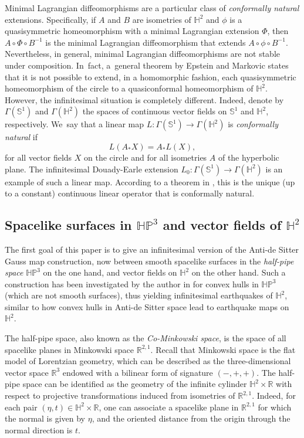 \documentclass[10pt]{amsart}
\theoremstyle{plain}
\theoremstyle{definition}
\newcommand{\HP}{\mathbb{HP}^3}
\begin{document}
Minimal Lagrangian diffeomorphisms are a particular class of \emph{conformally natural} extensions. Specifically, if \(A\) and \(B\) are isometries of \(\mathbb{H}^2\) and \(\phi\) is a quasisymmetric homeomorphism with a minimal Lagrangian extension \(\Phi\), then \(A \circ \Phi \circ B^{-1}\) is the minimal Lagrangian diffeomorphism that extends \(A \circ \phi \circ B^{-1}\). Nevertheless, in general, minimal Lagrangian diffeomorphisms are not stable under composition. In~fact, a~general theorem by Epstein and Markovic \cite{Stopdreamingthm} states that it is not possible to extend, in a homomorphic fashion, each quasisymmetric homeomorphism of the circle to a quasiconformal homeomorphism of \(\mathbb{H}^2\). However, the infinitesimal situation is completely different. Indeed, denote by $\Gamma(\mathbb{S}^1)$ and $\Gamma(\mathbb{H}^2)$ the spaces of continuous vector fields on $\mathbb{S}^1$ and $\mathbb{H}^2$, respectively. We~say that a linear map $L: \Gamma(\mathbb{S}^1) \to \Gamma(\mathbb{H}^2)$ is \emph{conformally natural} if
\[
L(A_* X) = A_* L(X),
\]
for all vector fields $X$ on the circle and for all isometries $A$ of the hyperbolic plane. The infinitesimal Douady-Earle extension $L_0: \Gamma(\mathbb{S}^1) \to \Gamma(\mathbb{H}^2)$ is an example of such a linear map. According to a theorem in \cite{Uniqueness_of_operator_L}, this is the unique (up to a constant) continuous linear operator that is conformally natural.

\subsection{Spacelike surfaces in \texorpdfstring{$\HP$}{HP}
and vector fields of \texorpdfstring{$\mathbb{H}^2$}{H2}}

The first goal of this paper is to give an infinitesimal version of the Anti-de Sitter Gauss map construction, now between smooth spacelike surfaces in the \emph{half-pipe space} \(\HP\) on the one hand, and vector fields on \(\mathbb{H}^2\) on the other hand. Such a construction has been investigated by the author in \cite{diaf2023Infearth} for convex hulls in \(\HP\) (which are not smooth surfaces), thus yielding infinitesimal earthquakes of \(\mathbb{H}^2\), similar to how convex hulls in Anti-de Sitter space lead to earthquake maps on \(\mathbb{H}^2\).

The half-pipe space, also known as the \emph{Co-Minkowski space}, is the space of all spacelike planes in Minkowski space \(\mathbb{R}^{2,1}\). Recall that Minkowski space is the flat model of Lorentzian geometry, which can be described as the three-dimensional vector space \(\mathbb{R}^3\) endowed with a bilinear form of signature \((-,+,+)\). The half-pipe space can be identified as the geometry of the infinite cylinder \(\mathbb{H}^2 \times \mathbb{R}\) with respect to projective transformations induced from isometries of \(\mathbb{R}^{2,1}\). Indeed, for each pair \((\eta,t) \in \mathbb{H}^2 \times \mathbb{R}\), one can associate a spacelike plane in \(\mathbb{R}^{2,1}\) for which the normal is given by \(\eta\), and the oriented distance from the origin through the normal direction is \(t\).
\end{document}
